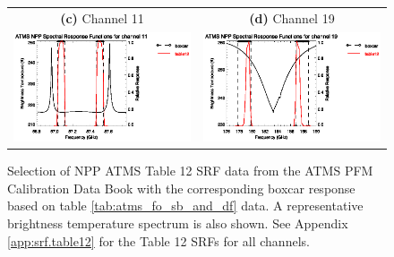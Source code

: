 \begin{figure}[htp]
\begin{tabular}{c c}
    \textsf{\textbf{(c)} Channel 11} &
    \textsf{\textbf{(d)} Channel 19} \\
    \includegraphics[bb=70 400 300 559,clip,scale=1.0]{graphics/srf/table12/atms_npp.ch11.osrf.eps} &
    \includegraphics[bb=70 400 300 559,clip,scale=1.0]{graphics/srf/table12/atms_npp.ch19.osrf.eps}
  \end{tabular}
  \caption{Selection of NPP ATMS Table 12 SRF data from the ATMS PFM Calibration Data Book\cite{ATMS_PFM_CalLog} with the corresponding boxcar response based on table \ref{tab:atms_fo_sb_and_df} data. A representative brightness temperature spectrum is also shown. See Appendix \ref{app:srf.table12} for the Table 12 SRFs for all channels.}
  \label{fig:table12.srf_selection}
\end{figure}


